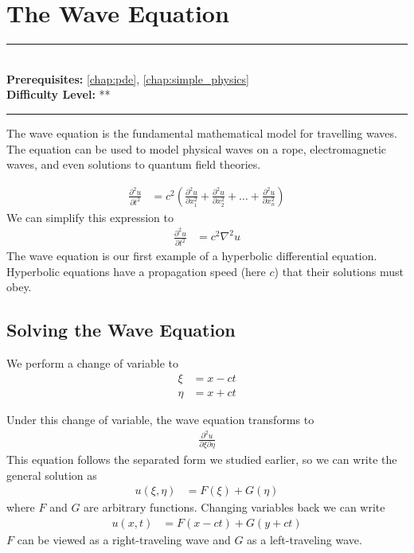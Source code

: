 \documentclass[book.tex]{subfiles}
\begin{document}
\chapter{The Wave Equation}

\label{chap:wave_equation}
\noindent\rule{11cm}{0.4pt} \\
\textbf{Prerequisites:} \autoref{chap:pde}, \autoref{chap:simple_physics} \\
\textbf{Difficulty Level:} ** \\
\noindent\rule{11cm}{0.4pt}
\vspace{5mm}
The wave equation is the fundamental mathematical model for travelling waves. The equation can be used to model physical waves on a rope, electromagnetic waves, and even solutions to quantum field theories.

\begin{align}
    \frac{\partial^2 u}{\partial t^2} &= c^2 \left ( \frac{\partial^2 u}{\partial x_1^2} + \frac{\partial^2 u}{\partial x_2^2} + \dotsc + \frac{\partial^2 u}{\partial x_n^2}  \right )
\end{align}
We can simplify this expression to
\begin{align}
\frac{\partial^2 u}{\partial t^2} &= c^2 \nabla^2 u
\end{align}
The wave equation is our first example of a hyperbolic differential equation. Hyperbolic equations have a propagation speed (here $c$) that their solutions must obey.

\section{Solving the Wave Equation}

We perform a change of variable to
\begin{align}
\xi &= x - ct \\
\eta &= x + ct
\end{align}

Under this change of variable, the wave equation transforms to
\begin{align}
\frac{\partial^2 u}{\partial \xi \partial \eta}
\end{align}
This equation follows the separated form we studied earlier, so we can write the general solution as
\begin{align}
u(\xi, \eta) &= F(\xi) + G(\eta)
\end{align}
where $F$ and $G$ are arbitrary functions. Changing variables back we can write
\begin{align}
u(x, t) &= F(x-ct) + G(y+ct)
\end{align}
$F$ can be viewed as a right-traveling wave and $G$ as a left-traveling wave. 
\end{document}
